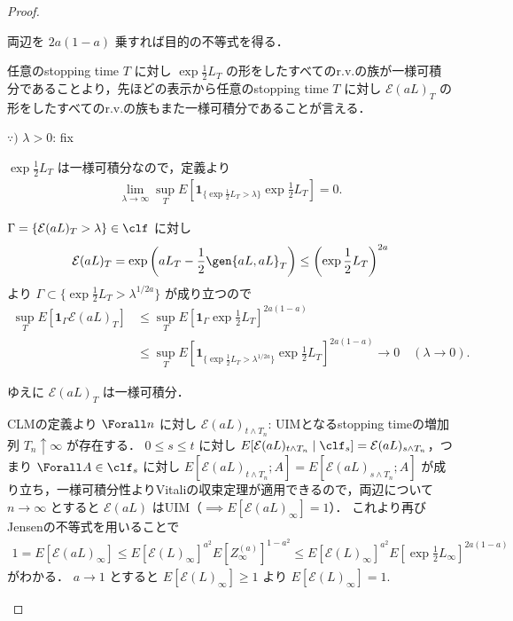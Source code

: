 \documentclass{jsarticle}
\begin{document}
\begin{proof}
\begin{description}
\begin{screen}
        両辺を $2a(1-a)$ 乗すれば目的の不等式を得る．
        \end{screen}
        
        任意のstopping time $T$ に対し $\exp\frac{1}{2}L_T$ の形をしたすべてのr.v.の族が一様可積分であることより，先ほどの表示から任意のstopping time $T$ に対し $\mathcal{E}(aL)_T$ の形をしたすべてのr.v.の族もまた一様可積分であることが言える．
        \begin{screen}
            $\because)$
            $\lambda>0$: fix

            $\exp\frac{1}{2}L_T$ は一様可積分なので，定義より
            \begin{align}
                \lim_{\lambda\to\infty}\sup_T E\left[\bm{1}_{\{\exp\frac{1}{2}L_T>\lambda\}}\exp\frac{1}{2}L_T\right]=0.
            \end{align}

            $\Gamma=\{\mathcal{E}(aL)_T>\lambda\}\in\clf$ に対し
            \begin{align}
                \mathcal{E}(aL)_T
                = \exp{\left(aL_T-\frac{1}{2}\gen{aL,aL}_T\right)}
                \le \left(\exp\frac{1}{2}L_T\right)^{2a}
            \end{align}
            より $\Gamma\subset \{\exp\frac{1}{2}L_T>\lambda^{1/2a}\}$ が成り立つので
            \begin{align}
                \sup_T E\left[\bm{1}_{\Gamma}\mathcal{E}(aL)_T\right]
                &\le \sup_T E\left[\bm{1}_{\Gamma}\exp\frac{1}{2}L_T\right]^{2a(1-a)} \\
                &\le \sup_T E\left[\bm{1}_{\{\exp\frac{1}{2}L_T>\lambda^{1/2a}\}}\exp\frac{1}{2}L_T\right]^{2a(1-a)}
                \longrightarrow 0\quad(\lambda\to0).
            \end{align}

            ゆえに $\mathcal{E}(aL)_T$ は一様可積分．
        \end{screen}
        
        CLMの定義より $\Forall n$ に対し $\mathcal{E}(aL)_{t\wedge T_n}$: UIMとなるstopping timeの増加列 $T_n\uparrow\infty$ が存在する．
        $0\le s\le t$ に対し $E[\mathcal{E}(aL)_{t\wedge T_n}\mid\clf_s]=\mathcal{E}(aL)_{s\wedge T_n}$，つまり $\Forall A\in\clf_s$ に対し $E[\mathcal{E}(aL)_{t\wedge T_n};A]=E[\mathcal{E}(aL)_{s\wedge T_n};A]$ が成り立ち，一様可積分性よりVitaliの収束定理が適用できるので，両辺について $n\to\infty$ とすると $\mathcal{E}(aL)$ はUIM（$\implies E[\mathcal{E}(aL)_{\infty}]=1$）．
        これより再びJensenの不等式を用いることで
        \begin{align}
            1=E[\mathcal{E}(aL)_{\infty}]
            \le E[\mathcal{E}(L)_\infty]^{a^2}
            E[Z_{\infty}^{(a)}]^{1-a^2}
            \le E[\mathcal{E}(L)_\infty]^{a^2}
            E\left[\exp\frac{1}{2}L_\infty\right]^{2a(1-a)}
        \end{align}
        がわかる．
        $a\to1$ とすると $E[\mathcal{E}(L)_\infty]\ge1$ より $E[\mathcal{E}(L)_\infty]=1.$
    \end{description}
\end{proof}
\end{document}
